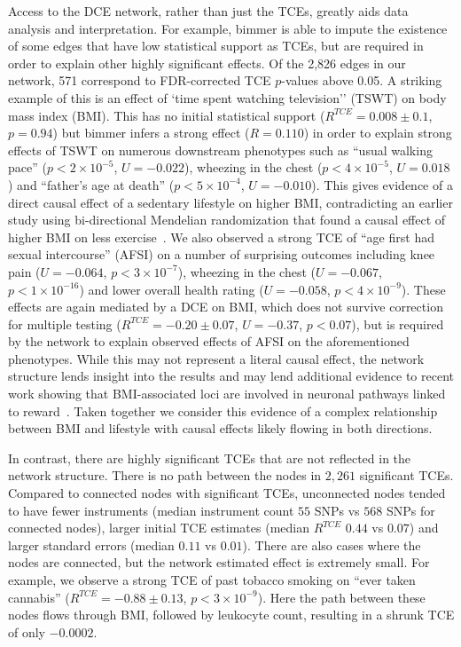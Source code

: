 \documentclass{article}
\begin{document}
Access to the DCE network, rather than just the TCEs, greatly aids data analysis and interpretation.
For example, bimmer is able to impute the existence of some edges that have low statistical
support as TCEs, but are required in order to explain other highly significant effects. Of the
2,826 edges in our network, 571 correspond to FDR-corrected TCE $p$-values above 0.05. A striking
example of this is an effect of `time spent watching television'' (TSWT) on body mass index (BMI).
This has no initial statistical support ($R^{TCE} = 0.008 \pm 0.1$, $p = 0.94$) but bimmer
infers a strong effect ($R = 0.110$) in order to explain strong effects of TSWT on numerous downstream
phenotypes such as ``usual walking pace'' ($p < 2 \times 10^{-5}$, $U = -0.022$),  wheezing in the chest
($p < 4\times 10^{-5}$, $U = 0.018$) and ``father's age at death'' ($p < 5\times 10^{-4}$, $U = -0.010$).
This gives evidence of a direct causal effect of a sedentary lifestyle on higher BMI, contradicting
an earlier study using bi-directional Mendelian randomization that found a causal effect of
higher BMI on less exercise~\cite{Richmond2014}.
We also observed a strong TCE of ``age first had sexual intercourse'' (AFSI) on a number
of surprising outcomes including knee pain ($U = -0.064$, $p < 3 \times 10^{-7}$),
wheezing in the chest ($U = -0.067$, $p < 1 \times 10^{-16}$) and
lower overall health rating ($U = -0.058$, $p < 4 \times 10^{-9}$). These effects are again
mediated by a DCE on BMI, which does not survive
correction for multiple testing ($R^{TCE} = -0.20 \pm 0.07$, $U = -0.37$, $p < 0.07$),
but is required by the network to explain observed effects of AFSI on the aforementioned phenotypes.
While this may not represent a literal causal effect, the network structure lends
insight into the results and may lend additional evidence to recent work
showing that BMI-associated loci are involved
in neuronal pathways linked to reward~\cite{Ndiaye2020}. Taken together we consider
this evidence of a complex relationship between BMI and lifestyle with causal effects
likely flowing in both directions.


In contrast, there are highly significant TCEs that are not reflected in
the network structure. There is no path between the nodes in $2,261$ significant TCEs.
Compared to connected nodes with significant TCEs, unconnected nodes tended to have fewer instruments
(median instrument count $55$ SNPs vs $568$ SNPs for connected nodes), larger initial
TCE estimates (median $R^{TCE}$ $0.44$ vs $0.07$) and larger standard errors
(median $0.11$ vs $0.01$). There are also cases where the nodes are connected, but the network
estimated effect is extremely small.
For example, we observe a strong TCE of 
past tobacco smoking on ``ever taken cannabis'' ($R^{TCE} = -0.88 \pm 0.13$, $p < 3 \times 10^{-9}$).
Here the path between these nodes flows through BMI, followed by leukocyte count,
resulting in a shrunk TCE of only $-0.0002$.
 
\end{document}
